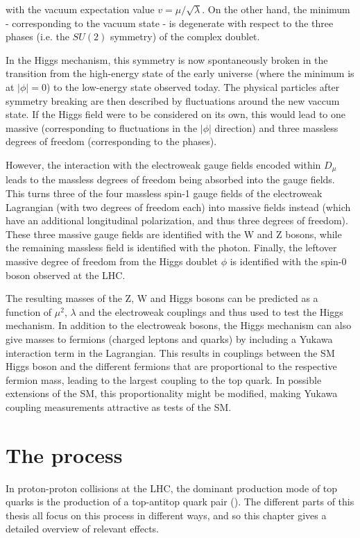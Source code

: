 \noindent with the vacuum expectation value $v = \mu / \sqrt{\lambda}$. On the other hand, the minimum - corresponding to the vacuum state - is degenerate with respect to the three phases (i.e. the $SU(2)$ symmetry) of the complex doublet.

In the Higgs mechanism, this symmetry is now spontaneously broken in the transition from the high-energy state of the early universe (where the minimum is at $|\phi| = 0$) to the low-energy state observed today. The physical particles after symmetry breaking are then described by fluctuations around the new vaccum state. If the Higgs field were to be considered on its own, this would lead to one massive (corresponding to fluctuations in the $|\phi|$ direction) and three massless degrees of freedom (corresponding to the phases).

However, the interaction with the electroweak gauge fields encoded within $D_\mu$ leads to the massless degrees of freedom being absorbed into the gauge fields. This turns three of the four massless spin-1 gauge fields of the electroweak Lagrangian (with two degrees of freedom each) into massive fields instead (which have an additional longitudinal polarization, and thus three degrees of freedom). These three massive gauge fields are identified with the W and Z bosons, while the remaining massless field is identified with the photon. Finally, the leftover massive degree of freedom from the Higgs doublet $\phi$ is identified with the spin-0 boson observed at the LHC.

The resulting masses of the Z, W and Higgs bosons can be predicted as a function of $\mu^2$, $\lambda$ and the electroweak couplings and thus used to test the Higgs mechanism. In addition to the electroweak bosons, the Higgs mechanism can also give masses to fermions (charged leptons and quarks) by including a Yukawa interaction term in the Lagrangian. This results in couplings between the SM Higgs boson and the different fermions that are proportional to the respective fermion mass, leading to the largest coupling to the top quark. In possible extensions of the SM, this proportionality might be modified, making Yukawa coupling measurements attractive as tests of the SM.

\section{The \texorpdfstring{\pptt}{pp -> tt} process}
\label{sec:theory:ttbar}

In proton-proton collisions at the LHC, the dominant production mode of top quarks is the production of a top-antitop quark pair (\ttbar). The different parts of this thesis all focus on this process in different ways, and so this chapter gives a detailed overview of relevant effects.

